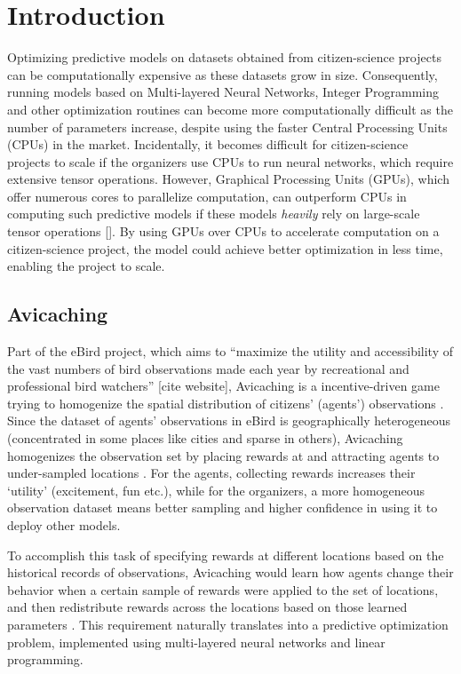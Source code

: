 \chapter{Introduction} \label{sec:Introduction}
Optimizing predictive models on datasets obtained from citizen-science projects can be computationally expensive as these datasets grow in size. Consequently, running models based on Multi-layered Neural Networks, Integer Programming and other optimization routines can become more computationally difficult as the number of parameters increase, despite using the faster Central Processing Units (CPUs) in the market. Incidentally, it becomes difficult for citizen-science projects to scale if the organizers use CPUs to run neural networks, which require extensive tensor operations. However, Graphical Processing Units (GPUs), which offer numerous cores to parallelize computation, can outperform CPUs in computing such predictive models if these models \textit{heavily} rely on large-scale tensor operations []. By using GPUs over CPUs to accelerate computation on a citizen-science project, the model could achieve better optimization in less time, enabling the project to scale.

\section{Avicaching} \label{sec:Avicaching}
Part of the eBird project, which aims to ``maximize the utility and accessibility of the vast numbers of bird observations made each year by recreational and professional bird watchers'' [cite website], Avicaching is a incentive-driven game trying to homogenize the spatial distribution of citizens' (agents') observations \cite{Xue2016Avi1}. Since the dataset of agents' observations in eBird is geographically heterogeneous (concentrated in some places like cities and sparse in others), Avicaching homogenizes the observation set by placing rewards at and attracting agents to under-sampled locations \cite{Xue2016Avi1}. For the agents, collecting rewards increases their `utility' (excitement, fun etc.), while for the organizers, a more homogeneous observation dataset means better sampling and higher confidence in using it to deploy other models. 

To accomplish this task of specifying rewards at different locations based on the historical records of observations, Avicaching would learn how agents change their behavior when a certain sample of rewards were applied to the set of locations, and then redistribute rewards across the locations based on those learned parameters \cite{Xue2016Avi2}. This requirement naturally translates into a predictive optimization problem, implemented using multi-layered neural networks and linear programming.

